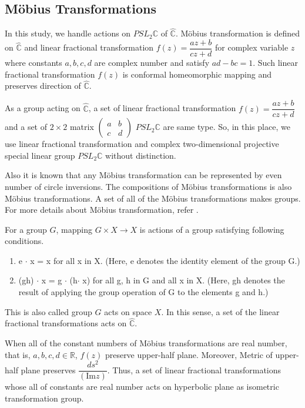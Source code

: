 
\subsection{M\"obius Transformations}

In this study, we handle actions on $PSL_2\mathbb{C}$ of $\hat{\mathbb{C}}$.
M\"obius transformation is defined on $\hat{\mathbb{C}}$ and
linear fractional transformation
$f(z)=\dfrac{az+b}{cz+d}$ for complex variable $z$ where constants
$a, b, c, d$ are complex number and satisfy $ad - bc = 1$.
Such linear fractional transformation $f(z)$ is conformal homeomorphic
mapping and preserves direction of $\hat{\mathbb{C}}$.

As a group acting on $\hat{\mathbb{C}}$, a set of linear fractional
transformation $f(z) = \dfrac{az + b}{cz + d}$
and a set of $2 \times 2$ matrix
$\begin{pmatrix}a & b \\ c& d \end{pmatrix}$
$PSL_2\mathbb{C}$ are same type.
So, in this place, we use linear fractional transformation and
complex two-dimensional projective special linear group
$PSL_2\mathbb{C}$ without distinction.

Also it is known that any M\"obius transformation can be represented by
even number of circle inversions.
The compositions of M\"obius transformations is also M\"obius
transformations. A set of all of the M\"obius transformations makes
groups. For more details about M\"obius transformation, refer
\cite{MumfordSeriesWright200204}\cite{marden_2016}.

For a group $G$, mapping $G \times X \to X$ is actions of a group
satisfying following conditions.
\begin{enumerate}
 \item e $\cdot$ x = x for all x in X. (Here, e denotes the identity element of
       the group G.)
 \item (gh) $\cdot$ x = g $\cdot$ (h$\cdot$ x) for all g, h in G and all x in X.
       (Here, gh denotes the result of applying the group operation of G to the elements g and h.)
\end{enumerate}
This is also called group $G$ acts on space $X$.
In this sense, a set of the linear fractional transformations acts on
$\hat{\mathbb{C}}$.

When all of the constant numbers of M\"obius transformations are real number,
that is, $a, b, c, d \in \mathbb{R}$, $f(z)$ preserve upper-half plane.
Moreover, Metric of upper-half plane preserves
$\dfrac{ds^2}{(\mathrm{Im}z)}$.
Thus, a set of linear fractional transformations whose all of constants
are real number acts on hyperbolic plane as isometric transformation group.

